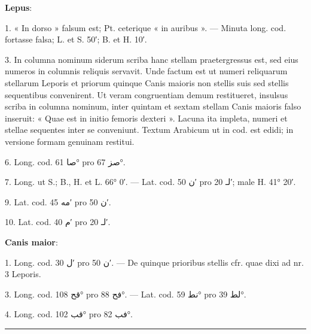 \documentclass[11pt]{article}
\begin{document}
{\small
\par\hspace*{8mm}\textbf{Lepus}:
\par\hangindent=12mm 1. « In dorso » falsum est; Pt. ceterique « in auribus ». — Minuta long. cod. fortasse falsa; L. et S. 50′; B. et H. 10′.
\par\hangindent=12mm 3. In columna nominum siderum scriba hanc stellam praetergressus est, sed eius numeros in columnis reliquis servavit. Unde factum est ut numeri reliquarum stellarum Leporis et priorum quinque Canis maioris non stellis suis sed stellis sequentibus convenirent. Ut veram congruentiam demum restitueret, insulsus scriba in columna nominum, inter quintam et sextam stellam Canis maioris falso inseruit: « Quae est in initio femoris dexteri ». Lacuna ita impleta, numeri et stellae sequentes inter se conveniunt. Textum Arabicum ut in cod. est edidi; in versione formam genuinam restitui.
\par\hangindent=12mm 6. Long. cod. \textarabic{صا} 61° pro \textarabic{صز} 67°.
\par\hangindent=12mm 7. Long. ut S.; B., H. et L. 66° 0′. — Lat. cod. \textarabic{ن} 50′ pro \textarabic{لـ} 20′; male H. 41° 20′.
\par\hangindent=12mm 9. Lat. cod. \textarabic{مه} 45′ pro \textarabic{ن} 50′.
\par\hangindent=12mm 10. Lat. cod. \textarabic{م} 40′ pro \textarabic{لـ} 20′.
\par\hspace*{8mm}\textbf{Canis maior}:
\par\hangindent=12mm 1. Long. cod. \textarabic{ل} 30′ pro \textarabic{ن} 50′. — De quinque prioribus stellis cfr. quae dixi ad nr. 3 Leporis.
\par\hangindent=12mm 3. Long. cod. \textarabic{قح} 108° pro \textarabic{فح} 88°. — Lat. cod. \textarabic{نط} 59° pro \textarabic{لط} 39°.
\par\hangindent=12mm 4. Long. cod. \textarabic{قب} 102° pro \textarabic{فب} 82°.
\par}
\clearpage
\noindent{}\par\vspace{-1mm}\noindent\rule{\textwidth}{.4pt}\par\vspace{2mm}
\end{document}
